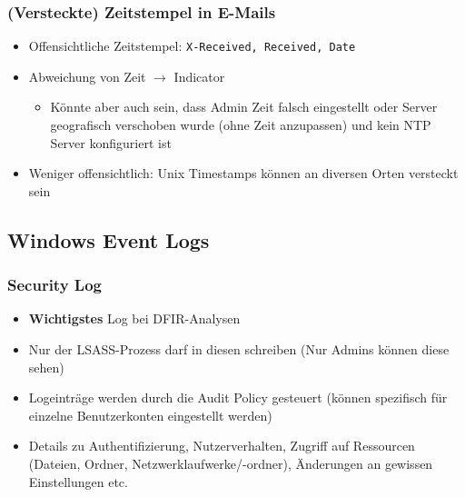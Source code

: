 \subsubsection{(Versteckte) Zeitstempel in E-Mails}
\begin{itemize}
    \item Offensichtliche Zeitstempel: \lstinline|X-Received, Received, Date|
    \item Abweichung von Zeit $\rightarrow$ Indicator
    \begin{itemize}
        \item Könnte aber auch sein, dass Admin Zeit falsch eingestellt oder Server geografisch verschoben wurde (ohne Zeit anzupassen) und kein NTP Server konfiguriert ist
    \end{itemize}
    \item Weniger offensichtlich: Unix Timestamps können an diversen Orten versteckt sein
\end{itemize}

\subsection{Windows Event Logs}

\subsubsection{Security Log}
\begin{itemize}
    \item \textbf{Wichtigstes} Log bei DFIR-Analysen
    \item Nur der LSASS-Prozess darf in diesen schreiben (Nur Admins können diese sehen)
    \item Logeinträge werden durch die Audit Policy gesteuert (können spezifisch für einzelne Benutzerkonten eingestellt werden)
    \item Details zu Authentifizierung, Nutzerverhalten, Zugriff auf Ressourcen (Dateien, Ordner, Netzwerklaufwerke/-ordner), Änderungen an gewissen Einstellungen etc.
\end{itemize}

